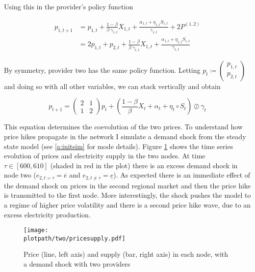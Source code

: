 Using this in the provider's policy function

\begin{equation*}
  \begin{split}
    p_{1, t+1} &= p_{1, t} + \frac{1-\beta}{\beta \ \gamma_{1, t}} X_{1, t} + \frac{\alpha_{1, t} + \eta_{1, t} S_{1, t}}{\gamma_{1, t}} + 2P^{(1, 2)} \\
    &= 2p_{1, t} + p_{2, t} + \frac{1-\beta}{\beta \ \gamma_{1, t}} X_{1, t} + \frac{\alpha_{1, t} + \eta_{1, t} S_{1, t}}{\gamma_{1, t}}
  \end{split}
\end{equation*}

By symmetry, provider two has the same policy function. Letting $p_t \coloneqq \begin{pmatrix}
    p_{1, t} \\ p_{2, t}
  \end{pmatrix}$ and doing so with all other variables, we can stack vertically and obtain

\begin{equation}
  p_{t+1} = \begin{pmatrix}
    2 & 1 \\
    1 & 2
  \end{pmatrix} p_t + \left( \frac{1-\beta}{\beta} X_t + \alpha_t + \eta_t \circ S_t \right) \oslash \gamma_t
\end{equation}

This equation determines the coevolution of the two prices. To understand how price hikes propagate in the network I simulate a demand shock from the steady state model (see \ref{a:initsim} for mode details). Figure \ref{fig:two} shows the time series evolution of prices and electricity supply in the two nodes. At time $\tau \in [600, 610]$ (shaded in red in the plot) there is an excess demand shock in node two ($e_{2, t = \tau} = \overline{e}$ and $e_{2, t \neq \tau} = \underline{e}$). As expected there is an immediate effect of the demand shock on prices in the second regional market and then the price hike is transmitted to the first node. More interestingly, the shock pushes the model to a regime of higher price volatility and there is a second price hike wave, due to an excess electricity production.


\begin{figure}[H]
  \centering
  \texttt{[image: \\plotpath/two/pricesupply.pdf]}
  \caption{Price (line, left axis) and supply (bar, right axis) in each node, with a demand shock with two providers} \label{fig:two}
\end{figure}

